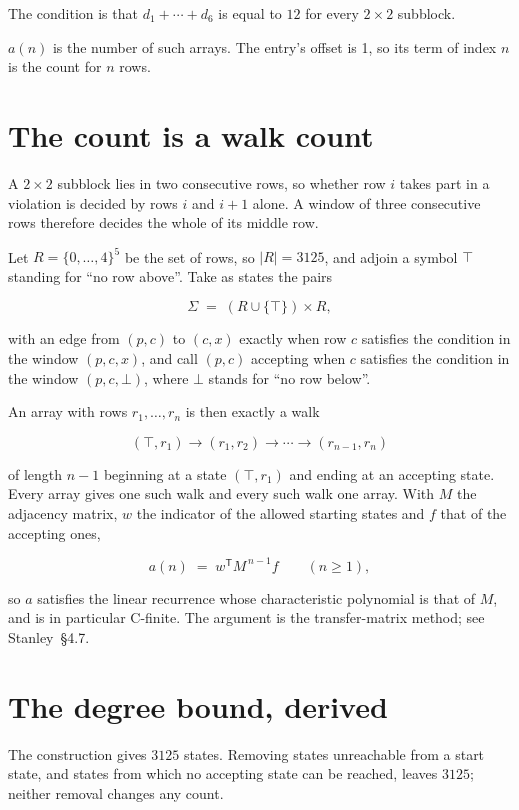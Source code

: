 \documentclass[11pt]{article}
\theoremstyle{definition}
\begin{document}
The condition is that $d_1+\cdots+d_6$ is equal to $12$ for every $2\times2$ subblock.

$a(n)$ is the number of such arrays. The entry's offset is 1, so its term of index $n$ is the count for $n$ rows.

\section{The count is a walk count}

A $2\times2$ subblock lies in two consecutive rows, so whether row $i$ takes part in a violation is decided by rows $i$ and $i+1$ alone. A window of three consecutive rows therefore decides the whole of its middle row.

Let $R = \{0,\dots,4\}^{5}$ be the set of rows, so $|R| = 3125$, and adjoin a symbol $\top$ standing for ``no row above''. Take as states the pairs

\[\Sigma \;=\; (R \cup \{\top\}) \times R,\]

with an edge from $(p,c)$ to $(c,x)$ exactly when row $c$ satisfies the condition in the window $(p,c,x)$, and call $(p,c)$ accepting when $c$ satisfies the condition in the window $(p,c,\bot)$, where $\bot$ stands for ``no row below''.

An array with rows $r_1,\dots,r_n$ is then exactly a walk

\[(\top,r_1) \to (r_1,r_2) \to \cdots \to (r_{n-1},r_n)\]

of length $n-1$ beginning at a state $(\top,r_1)$ and ending at an accepting state. Every array gives one such walk and every such walk one array. With $M$ the adjacency matrix, $w$ the indicator of the allowed starting states and $f$ that of the accepting ones,

\[a(n) \;=\; w^{\mathsf T} M^{\,n-1} f \qquad (n \ge 1),\]

so $a$ satisfies the linear recurrence whose characteristic polynomial is that of $M$, and is in particular C-finite. The argument is the transfer-matrix method; see Stanley~\S4.7.

\section{The degree bound, derived}

The construction gives $3125$ states. Removing states unreachable from a start state, and states from which no accepting state can be reached, leaves $3125$; neither removal changes any count.
\end{document}
